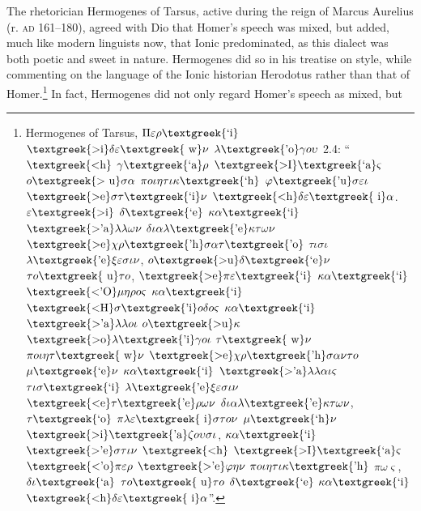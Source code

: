 The rhetorician Hermogenes of Tarsus, active during the reign of Marcus Aurelius (r. \textsc{ad} 161–180), agreed with Dio that Homer’s speech was mixed, but added, much like modern linguists now, that Ionic predominated, as this dialect was both poetic and sweet in nature. Hermogenes did so in his treatise on style, while commenting on the language of the Ionic historian Herodotus rather than that of Homer.\footnote{Hermogenes of Tarsus, $\Pi \varepsilon \rho \text{\textgreek{`i}}$ $\text{\textgreek{>i}}\delta \varepsilon \text{\textgreek{~w}}\nu $ $\lambda \text{\textgreek{'o}}\gamma o\upsilon $ 2.4: “$\text{\textgreek{<h}}$ $\gamma \text{\textgreek{`a}}\rho $ $\text{\textgreek{>I}}\text{\textgreek{`a}}\varsigma $ $o\text{\textgreek{>~u}}\sigma \alpha $ $\pi o\iota \eta \tau \iota \kappa \text{\textgreek{`h}}$ $\varphi \text{\textgreek{'u}}\sigma \varepsilon \iota $ $\text{\textgreek{>e}}\sigma \tau \text{\textgreek{`i}}\nu $ $\text{\textgreek{<h}}\delta \varepsilon \text{\textgreek{~i}}\alpha $. $\varepsilon \text{\textgreek{>i}}$ $\delta \text{\textgreek{`e}}$ $\kappa \alpha \text{\textgreek{`i}}$ $\text{\textgreek{>'a}}\lambda \lambda \omega \nu $ $\delta \iota \alpha \lambda \text{\textgreek{'e}}\kappa \tau \omega \nu $ $\text{\textgreek{>e}}\chi \rho \text{\textgreek{'h}}\sigma \alpha \tau \text{\textgreek{'o}}$ $\tau \iota \sigma \iota $ $\lambda \text{\textgreek{'e}}\xi \varepsilon \sigma \iota \nu $, $o\text{\textgreek{>u}}\delta \text{\textgreek{`e}}\nu $ $\tau o\text{\textgreek{~u}}\tau o$, $\text{\textgreek{>e}}\pi \varepsilon \text{\textgreek{`i}}$ $\kappa \alpha \text{\textgreek{`i}}$ $\text{\textgreek{<'O}}\mu \eta \rho o\varsigma $ $\kappa \alpha \text{\textgreek{`i}}$ $\text{\textgreek{<H}}\sigma \text{\textgreek{'i}}o\delta o\varsigma $ $\kappa \alpha \text{\textgreek{`i}}$ $\text{\textgreek{>'a}}\lambda \lambda o\iota $ $o\text{\textgreek{>u}}\kappa $ $\text{\textgreek{>o}}\lambda \text{\textgreek{'i}}\gamma o\iota $ $\tau \text{\textgreek{~w}}\nu $ $\pi o\iota \eta \tau \text{\textgreek{~w}}\nu $ $\text{\textgreek{>e}}\chi \rho \text{\textgreek{'h}}\sigma \alpha \nu \tau o$ $\mu \text{\textgreek{`e}}\nu $ $\kappa \alpha \text{\textgreek{`i}}$ $\text{\textgreek{>'a}}\lambda \lambda \alpha \iota \varsigma $ $\tau \iota \sigma \text{\textgreek{`i}}$ $\lambda \text{\textgreek{'e}}\xi \varepsilon \sigma \iota \nu $ $\text{\textgreek{<e}}\tau \text{\textgreek{'e}}\rho \omega \nu $ $\delta \iota \alpha \lambda \text{\textgreek{'e}}\kappa \tau \omega \nu $, $\tau \text{\textgreek{`o}}$ $\pi \lambda \varepsilon \text{\textgreek{~i}}\sigma \tau o\nu $ $\mu \text{\textgreek{`h}}\nu $ $\text{\textgreek{>i}}\text{\textgreek{'a}}\zeta o\upsilon \sigma \iota $, $\kappa \alpha \text{\textgreek{`i}}$ $\text{\textgreek{>'e}}\sigma \tau \iota \nu $ $\text{\textgreek{<h}}$ $\text{\textgreek{>I}}\text{\textgreek{`a}}\varsigma $ $\text{\textgreek{<'o}}\pi \varepsilon \rho $ $\text{\textgreek{>'e}}\varphi \eta \nu $ $\pi o\iota \eta \tau \iota \kappa \text{\textgreek{'h}}$ $\pi \omega \varsigma $, $\delta \iota \text{\textgreek{`a}}$ $\tau o\text{\textgreek{~u}}\tau o$ $\delta \text{\textgreek{`e}}$ $\kappa \alpha \text{\textgreek{`i}}$ $\text{\textgreek{<h}}\delta \varepsilon \text{\textgreek{~i}}\alpha $”.} In fact, Hermogenes did not only regard Homer’s speech as mixed, but 